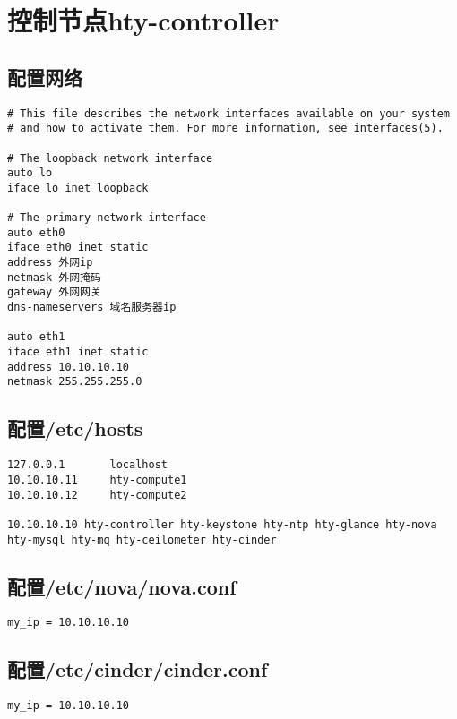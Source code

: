 \documentclass[a4paper,left=1.5cm,right=1.5cm,11pt]{article}
\begin{document}
\tableofcontents

\clearpage
\section{控制节点hty-controller}
\subsection{配置网络}
\begin{lstlisting}
# This file describes the network interfaces available on your system
# and how to activate them. For more information, see interfaces(5).

# The loopback network interface
auto lo
iface lo inet loopback

# The primary network interface
auto eth0
iface eth0 inet static
address 外网ip
netmask 外网掩码
gateway 外网网关
dns-nameservers 域名服务器ip

auto eth1
iface eth1 inet static
address 10.10.10.10
netmask 255.255.255.0
\end{lstlisting}
\subsection{配置/etc/hosts}
\begin{lstlisting}
127.0.0.1       localhost
10.10.10.11     hty-compute1
10.10.10.12     hty-compute2

10.10.10.10 hty-controller hty-keystone hty-ntp hty-glance hty-nova hty-mysql hty-mq hty-ceilometer hty-cinder
\end{lstlisting}
\subsection{配置/etc/nova/nova.conf}
\begin{lstlisting}
my_ip = 10.10.10.10
\end{lstlisting}
\subsection{配置/etc/cinder/cinder.conf}
\begin{lstlisting}
my_ip = 10.10.10.10
\end{lstlisting}
\end{document}
